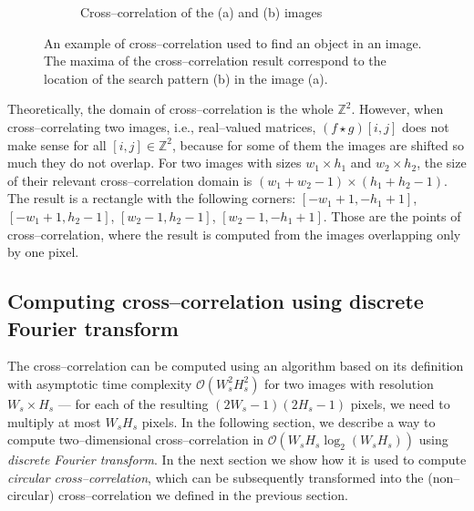 \begin{figure}[b!]
\begin{subfigure}{.5\textwidth}
		\caption{Cross--correlation of the (a) and (b) images}
		\label{2d-correlation-example-result}
	\end{subfigure}
	
	\caption{An example of cross--correlation used to find an object in an image. The maxima of the cross--correlation result correspond to the location of the search pattern (b) in the image (a).}
	\label{2d-correlation-example}
\end{figure}

Theoretically, the domain of cross--correlation is the whole $\mathbb{Z}^2$. However, when cross--correlating two images, i.e., real--valued matrices, $(f \star g)[i,j]$ does not make sense for all $[i,j] \in \mathbb{Z}^2$, because for some of them the images are shifted so much they do not overlap. For two images with sizes $w_1 \times h_1$ and $w_2 \times h_2$, the size of their relevant cross--correlation domain is $(w_1 + w_2 - 1) \times (h_1 + h_2 - 1)$. The result is a rectangle with the following corners: $[-w_1+1,-h_1+1]$, $[-w_1+1,h_2-1]$, $[w_2-1,h_2-1]$, $[w_2-1,-h_1+1]$. Those are the points of cross--correlation, where the result is computed from the images overlapping only by one pixel.

\subsection{Computing cross--correlation using discrete \\ Fourier transform}
\label{fft}

The cross--correlation can be computed using an algorithm based on its definition with asymptotic time complexity $\mathcal{O}(W_s^2H_s^2)$ for two images with resolution $W_s \times H_s$ --- for each of the resulting $(2W_s - 1)(2H_s - 1)$ pixels, we need to multiply at most $W_sH_s$ pixels. In the following section, we describe a way to compute two--dimensional cross--correlation in $\mathcal{O}(W_sH_s\log_2(W_sH_s))$ using \emph{discrete Fourier transform}. In the next section we show how it is used to compute \emph{circular cross--correlation}, which can be subsequently transformed into the (non--circular) cross--correlation we defined in the previous section.


